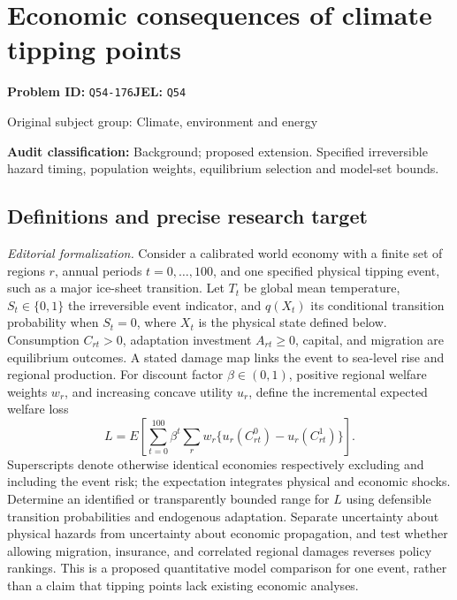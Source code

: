 \documentclass[11pt,a4paper]{article}
\begin{document}
\section*{Economic consequences of climate tipping points}
\textbf{Problem ID:} \texttt{Q54-176}\quad \textbf{JEL:} \texttt{Q54}\par
\label{problem:OP-0431}
{\sffamily\small\color{muted}Original subject group: Climate, environment and energy\par}
\label{definitions:problem:30007713}
\textbf{Audit classification:} Background; proposed extension. Specified irreversible hazard timing, population weights, equilibrium selection and model-set bounds.
\subsection*{Definitions and precise research target}
\textit{Editorial formalization.} Consider a calibrated world economy with a finite set of regions \(r\), annual periods \(t=0,\ldots,100\), and one specified physical tipping event, such as a major ice-sheet transition. Let \(T_t\) be global mean temperature, \(S_t\in\{0,1\}\) the irreversible event indicator, and \(q(X_t)\) its conditional transition probability when \(S_t=0\), where \(X_t\) is the physical state defined below. Consumption \(C_{rt}>0\), adaptation investment \(A_{rt}\geq0\), capital, and migration are equilibrium outcomes. A stated damage map links the event to sea-level rise and regional production. For discount factor \(\beta\in(0,1)\), positive regional welfare weights \(w_r\), and increasing concave utility \(u_r\), define the incremental expected welfare loss
\[L=E\!\left[\sum_{t=0}^{100}\beta^t\sum_r w_r\{u_r(C_{rt}^{0})-u_r(C_{rt}^{1})\}\right].\]
Superscripts denote otherwise identical economies respectively excluding and including the event risk; the expectation integrates physical and economic shocks. Determine an identified or transparently bounded range for \(L\) using defensible transition probabilities and endogenous adaptation. Separate uncertainty about physical hazards from uncertainty about economic propagation, and test whether allowing migration, insurance, and correlated regional damages reverses policy rankings. This is a proposed quantitative model comparison for one event, rather than a claim that tipping points lack existing economic analyses.
\end{document}
